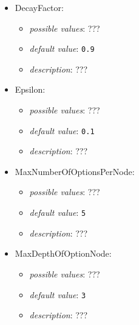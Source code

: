 \documentclass{article}
\begin{document}
\begin{itemize}
    \item DecayFactor:
           \begin{itemize}
                \item \emph{possible values}: ???
                \item \emph{default value}: \texttt{0.9}
                \item \emph{description}: ???
           \end{itemize}
    \item Epsilon:
           \begin{itemize}
                \item \emph{possible values}: ???
                \item \emph{default value}: \texttt{0.1}
                \item \emph{description}: ???
           \end{itemize}
    \item MaxNumberOfOptionsPerNode:
           \begin{itemize}
                \item \emph{possible values}: ???
                \item \emph{default value}: \texttt{5}
                \item \emph{description}: ???
           \end{itemize}
    \item MaxDepthOfOptionNode:
           \begin{itemize}
                \item \emph{possible values}: ???
                \item \emph{default value}: \texttt{3}
                \item \emph{description}: ???
           \end{itemize}
\end{itemize}
\end{document}
